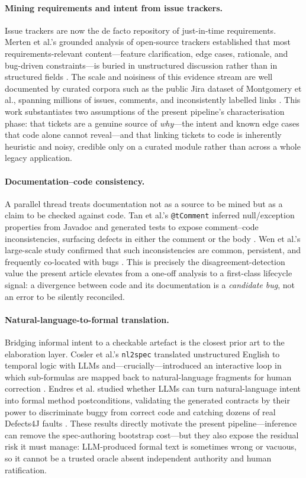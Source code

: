 \paragraph{Mining requirements and intent from issue trackers.}
Issue trackers are now the de facto repository of just-in-time requirements. Merten et al.'s grounded analysis of open-source trackers established that most requirements-relevant content---feature clarification, edge cases, rationale, and bug-driven constraints---is buried in unstructured discussion rather than in structured fields \cite{merten2015issuetracking}. The scale and noisiness of this evidence stream are well documented by curated corpora such as the public Jira dataset of Montgomery et al., spanning millions of issues, comments, and inconsistently labelled links \cite{montgomery2022jira}. This work substantiates two assumptions of the present pipeline's characterisation phase: that tickets are a genuine source of \emph{why}---the intent and known edge cases that code alone cannot reveal---and that linking tickets to code is inherently heuristic and noisy, credible only on a curated module rather than across a whole legacy application.

\paragraph{Documentation--code consistency.}
A parallel thread treats documentation not as a source to be mined but as a claim to be checked against code. Tan et al.'s \texttt{@tComment} inferred null/exception properties from Javadoc and generated tests to expose comment--code inconsistencies, surfacing defects in either the comment or the body \cite{tan2012tcomment}. Wen et al.'s large-scale study confirmed that such inconsistencies are common, persistent, and frequently co-located with bugs \cite{wen2019codecomment}. This is precisely the disagreement-detection value the present article elevates from a one-off analysis to a first-class lifecycle signal: a divergence between code and its documentation is a \emph{candidate bug}, not an error to be silently reconciled.

\paragraph{Natural-language-to-formal translation.}
Bridging informal intent to a checkable artefact is the closest prior art to the elaboration layer. Cosler et al.'s \texttt{nl2spec} translated unstructured English to temporal logic with LLMs and---crucially---introduced an interactive loop in which sub-formulas are mapped back to natural-language fragments for human correction \cite{cosler2023nl2spec}. Endres et al. studied whether LLMs can turn natural-language intent into formal method postconditions, validating the generated contracts by their power to discriminate buggy from correct code and catching dozens of real Defects4J faults \cite{endres2024nl2postcond}. These results directly motivate the present pipeline---inference can remove the spec-authoring bootstrap cost---but they also expose the residual risk it must manage: LLM-produced formal text is sometimes wrong or vacuous, so it cannot be a trusted oracle absent independent authority and human ratification.

